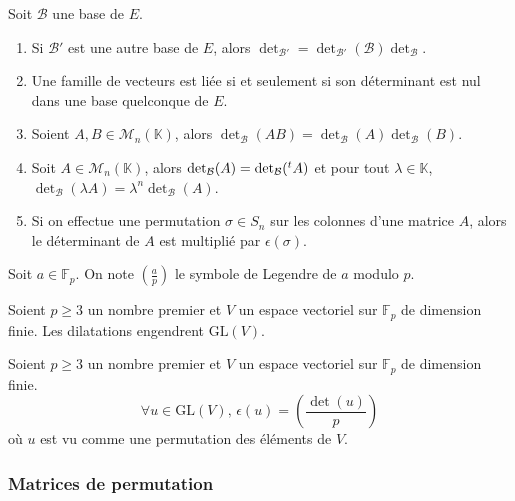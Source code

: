   \begin{corollary}
    Soit $\mathcal{B}$ une base de $E$.
    \begin{enumerate}[label={\bfseries(\roman*)}]
      \item Si $\mathcal{B}'$ est une autre base de $E$, alors $\det_{\mathcal{B}'} = \det_{\mathcal{B}'}(\mathcal{B}) \det_{\mathcal{B}}$.
      \item Une famille de vecteurs est liée si et seulement si son déterminant est nul dans une base quelconque de $E$.
      \item Soient $A, B \in \mathcal{M}_n(\mathbb{K})$, alors $\det_{\mathcal{B}}(AB) = \det_{\mathcal{B}}(A) \det_{\mathcal{B}}(B)$.
      \item Soit $A \in \mathcal{M}_n(\mathbb{K})$, alors $\det_{\mathcal{B}}(A) = \det_{\mathcal{B}}(\mathstrut ^t A)$ et pour tout $\lambda \in \mathbb{K}$, $\det_{\mathcal{B}}(\lambda A) = \lambda^n \det_{\mathcal{B}}(A)$.
      \item Si on effectue une permutation $\sigma \in S_n$ sur les colonnes d'une matrice $A$, alors le déterminant de $A$ est multiplié par $\epsilon(\sigma)$.
    \end{enumerate}
  \end{corollary}


  \begin{notation}
    Soit $a \in \mathbb{F}_p$. On note $\left( \frac{a}{p} \right)$ le symbole de Legendre de $a$ modulo $p$.
  \end{notation}

  \begin{lemma}
    Soient $p \geq 3$ un nombre premier et $V$ un espace vectoriel sur $\mathbb{F}_p$ de dimension finie. Les dilatations engendrent $\mathrm{GL}(V)$.
  \end{lemma}


  \begin{theorem}
    Soient $p \geq 3$ un nombre premier et $V$ un espace vectoriel sur $\mathbb{F}_p$ de dimension finie.
    \[ \forall u \in \mathrm{GL}(V), \, \epsilon(u) = \left( \frac{\det(u)}{p} \right) \]
    où $u$ est vu comme une permutation des éléments de $V$.
  \end{theorem}

  \subsubsection{Matrices de permutation}

